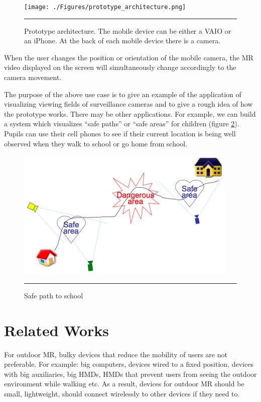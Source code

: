 \begin{figure}[htbp]
	\centering
	\texttt{[image: ./Figures/prototype\_architecture.png]}
	\rule{35em}{0.5pt}
	\caption[Prototype architecture]{Prototype architecture. The mobile device can be either a VAIO or an iPhone. At the back of each mobile device there is a camera.}
	\label{fig:PrototypeArchitecture}
\end{figure}

When the user changes the position or orientation of the mobile camera, the MR video displayed on the screen will simultaneously change accordingly to the camera movement.

The purpose of the above use case is to give an example of the application of visualizing viewing fields of surveillance cameras and to give a rough idea of how the prototype works. There may be other applications. For example, we can build a system which visualizes ``safe paths'' or ``safe areas'' for children (figure \ref{fig:HomeSchool}). Pupils can use their cell phones to see if their current location is being well observed when they walk to school or go home from school.

\begin{figure}[htbp]
	\centering
	\includegraphics{./Primitives/home_school.png}
	\rule{35em}{0.5pt}
	\caption[Safe path to school]{Safe path to school}
	\label{fig:HomeSchool}
\end{figure}


\section{Related Works}

For outdoor MR, bulky devices that reduce the mobility of users are not preferable. For example: big computers, devices wired to a fixed position, devices with big auxiliaries, big HMDs, HMDs that prevent users from seeing the outdoor environment while walking etc. As a result, devices for outdoor MR should be small, lightweight, should connect wirelessly to other devices if they need to.

